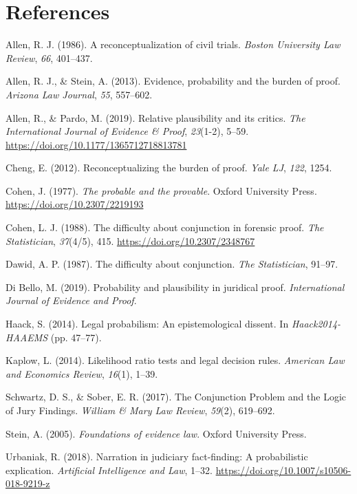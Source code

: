 \documentclass[10pt,dvipsnames,enabledeprecatedfontcommands]{scrartcl}
\begin{document}
\hypertarget{references}{%
\section*{References}\label{references}}

\hypertarget{refs}{}
\leavevmode\hypertarget{ref-Allen1986A-Reconceptuali}{}%
Allen, R. J. (1986). A reconceptualization of civil trials. \emph{Boston
University Law Review}, \emph{66}, 401--437.

\leavevmode\hypertarget{ref-allen2013}{}%
Allen, R. J., \& Stein, A. (2013). Evidence, probability and the burden
of proof. \emph{Arizona Law Journal}, \emph{55}, 557--602.

\leavevmode\hypertarget{ref-AllenPardo2019relative}{}%
Allen, R., \& Pardo, M. (2019). Relative plausibility and its critics.
\emph{The International Journal of Evidence \& Proof}, \emph{23}(1-2),
5--59. \url{https://doi.org/10.1177/1365712718813781}

\leavevmode\hypertarget{ref-cheng2012reconceptualizing}{}%
Cheng, E. (2012). Reconceptualizing the burden of proof. \emph{Yale LJ},
\emph{122}, 1254.

\leavevmode\hypertarget{ref-Cohen1977The-probable-an}{}%
Cohen, J. (1977). \emph{The probable and the provable}. Oxford
University Press. \url{https://doi.org/10.2307/2219193}

\leavevmode\hypertarget{ref-cohen1988difficulty}{}%
Cohen, L. J. (1988). The difficulty about conjunction in forensic proof.
\emph{The Statistician}, \emph{37}(4/5), 415.
\url{https://doi.org/10.2307/2348767}

\leavevmode\hypertarget{ref-dawid1987difficulty}{}%
Dawid, A. P. (1987). The difficulty about conjunction. \emph{The
Statistician}, 91--97.

\leavevmode\hypertarget{ref-DiBello2019plausibility}{}%
Di Bello, M. (2019). Probability and plausibility in juridical proof.
\emph{International Journal of Evidence and Proof}.

\leavevmode\hypertarget{ref-haack2011legal}{}%
Haack, S. (2014). Legal probabilism: An epistemological dissent. In
\emph{Haack2014-HAAEMS} (pp. 47--77).

\leavevmode\hypertarget{ref-kaplow2014likelihood}{}%
Kaplow, L. (2014). Likelihood ratio tests and legal decision rules.
\emph{American Law and Economics Review}, \emph{16}(1), 1--39.

\leavevmode\hypertarget{ref-schwartz2017ConjunctionProblemLogic}{}%
Schwartz, D. S., \& Sober, E. R. (2017). The Conjunction Problem and the
Logic of Jury Findings. \emph{William \& Mary Law Review}, \emph{59}(2),
619--692.

\leavevmode\hypertarget{ref-Stein05}{}%
Stein, A. (2005). \emph{Foundations of evidence law}. Oxford University
Press.

\leavevmode\hypertarget{ref-urbaniak2018narration}{}%
Urbaniak, R. (2018). Narration in judiciary fact-finding: A
probabilistic explication. \emph{Artificial Intelligence and Law},
1--32. \url{https://doi.org/10.1007/s10506-018-9219-z}
\end{document}
